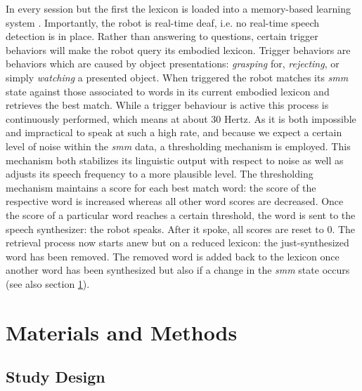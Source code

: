 In every session but the first the lexicon is loaded into a memory-based learning system \cite{Daelemans2005}. Importantly, the robot is real-time deaf,
i.e. no real-time speech detection is in place. Rather than answering to questions, certain trigger  behaviors will make the robot query its embodied lexicon.
Trigger behaviors are behaviors which are caused by object presentations: \emph{grasping} for, \emph{rejecting}, or simply \emph{watching} a presented object.
When triggered the robot matches its \emph{smm} state against those associated to words in its current embodied lexicon and retrieves the best match. While a trigger
behaviour is active this process is continuously performed, which means at about 30 Hertz. As it is both impossible and impractical to speak at such a high rate, and
because we expect a certain level of noise within the \emph{smm} data, a thresholding mechanism is employed. This mechanism both stabilizes its linguistic output with
respect to noise as well as adjusts its speech frequency to a more plausible level.
The thresholding mechanism maintains a score for each best match word: the score of the respective word is increased whereas all other word scores are
decreased. Once the score of a particular word reaches a certain threshold, the word is sent to the speech synthesizer: the robot speaks. After it spoke,
all scores are reset to 0. The retrieval process now starts anew but on a reduced lexicon: the just-synthesized word has been removed.
The removed word is added back to the lexicon once another word has been synthesized but also if a change in the \emph{smm} state occurs (see also
section \ref{sec:material}).

\section{Materials and Methods}
\label{sec:material}

\subsection{Study Design}
 
